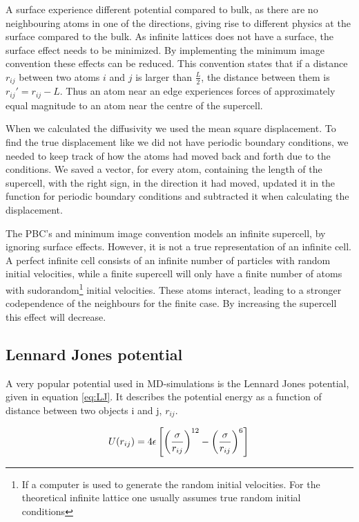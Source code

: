 A surface experience different potential compared to bulk, as there are no neighbouring atoms in one of the directions, giving rise to different physics at the surface compared to the bulk. As infinite lattices does not have a surface, the surface effect needs to be minimized. By implementing the minimum image convention these effects can be reduced. This convention states that if a distance $ r_{ij} $ between two atoms $ i $ and $ j $ is larger than $ \frac{L}{2} $, the distance between them is $  r_{ij}'  = r_{ij}-L$. Thus an atom  near an edge experiences forces of approximately equal magnitude to an atom near the centre of the supercell. 

When we calculated the diffusivity we used the mean square displacement. To find the true displacement like we did not have periodic boundary conditions, we needed to keep track of how the atoms had moved back and forth due to the conditions. We saved a vector, for every atom, containing the length of the supercell, with the right sign, in the direction it had moved, updated it in the function for periodic boundary conditions and subtracted it when calculating the displacement. 

The PBC's and minimum image convention models an infinite supercell, by ignoring surface effects. However, it is not a true representation of an infinite cell. A perfect infinite cell consists of an infinite number of particles with random initial velocities, while a finite supercell will only have a finite number of atoms with sudorandom\footnote{If a computer is used to generate the random initial velocities. For the theoretical infinite lattice one usually assumes true random initial conditions} initial velocities. These atoms interact, leading to a stronger codependence of the neighbours for the finite case. By increasing the supercell this effect will decrease.   	


\subsection{Lennard Jones potential \label{sec:LJ}}

A very popular potential used in MD-simulations is the Lennard Jones potential, given in equation \ref{eq:LJ}. It describes the potential energy as a function of distance between two objects i and j, $ r_{ij} $. 

\begin{equation}\label{eq:LJ}
	U(r_{ij}) = 4\epsilon \left[	\left(\frac{\sigma}{r_{ij}}	\right)^{12}		- \left(\frac{\sigma}{r_{ij}}	\right)^{6}				\right]\\
\end{equation}




